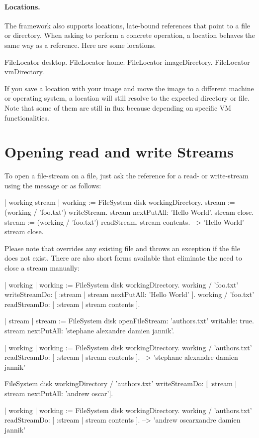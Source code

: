 \documentclass[a4paper,10pt,twoside]{book}
\begin{document}
\paragraph{Locations.}
The framework also supports locations, late-bound references that point to a file or directory. When asking to perform a concrete operation, a location behaves the same way as a reference. Here are some  locations.

\begin{code}{}
FileLocator desktop.
FileLocator home.
FileLocator imageDirectory.
FileLocator vmDirectory.
\end{code} 

If you save a location with your image and move the image to a different machine or operating system, a location will still resolve to the expected directory or file. Note that some of them are still in flux because depending on specific VM functionalities. 

\section{Opening read and write Streams}
To open a file-stream on a file, just ask the reference for a read- or write-stream using the message  or  as follows:

\begin{code}{}
| working stream |
working := FileSystem disk workingDirectory.
stream := (working / 'foo.txt') writeStream.
stream nextPutAll: 'Hello World'.
stream close.
stream := (working / 'foo.txt') readStream.
stream contents.			--> 'Hello World'
stream close.
\end{code}

Please note that  overrides any existing file and  throws an exception if the file does not exist. There are also short forms available that eliminate the need to close a stream manually:

\begin{code}{}
| working  |
working := FileSystem disk workingDirectory.
working / 'foo.txt' writeStreamDo: [ :stream | stream nextPutAll: 'Hello World' ].
working / 'foo.txt' readStreamDo: [ :stream | stream contents ].
\end{code}


\begin{code}{}
| stream |
stream := FileSystem disk openFileStream: 'authors.txt' writable: true.
stream nextPutAll: 'stephane alexandre damien jannik'.
	
| working |
working := FileSystem disk workingDirectory.
working / 'authors.txt' readStreamDo: [ :stream | stream contents ]. 
   --> 'stephane alexandre damien jannik'
   
FileSystem disk workingDirectory / 'authors.txt' 
	writeStreamDo: [ :stream | stream nextPutAll: 'andrew oscar'].

| working |
working := FileSystem disk workingDirectory.
working / 'authors.txt' readStreamDo: [ :stream | stream contents ]. 
	--> 'andrew oscarxandre damien jannik'
\end{code}
\end{document}
